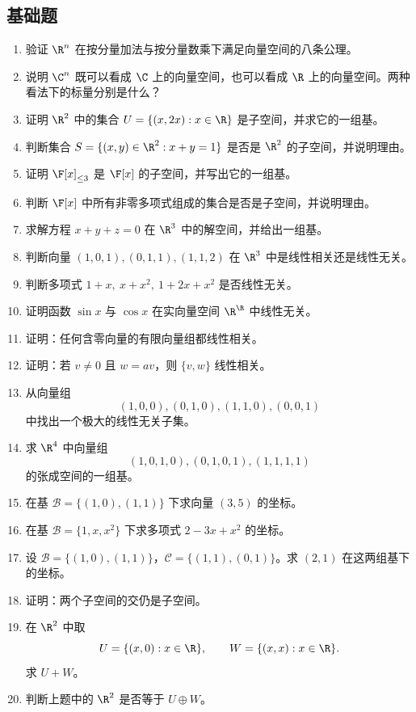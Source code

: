 \subsection*{基础题}
\begin{enumerate}[label=\arabic*., leftmargin=2.5em]
  \item \basic 验证 $\R^n$ 在按分量加法与按分量数乘下满足向量空间的八条公理。
  \item \basic 说明 $\C^n$ 既可以看成 $\C$ 上的向量空间，也可以看成 $\R$ 上的向量空间。两种看法下的标量分别是什么？
  \item \basic 证明 $\R^2$ 中的集合 $U=\{(x,2x):x\in\R\}$ 是子空间，并求它的一组基。
  \item \basic 判断集合 $S=\{(x,y)\in\R^2:x+y=1\}$ 是否是 $\R^2$ 的子空间，并说明理由。
  \item \basic 证明 $\F[x]_{\le 3}$ 是 $\F[x]$ 的子空间，并写出它的一组基。
  \item \basic 判断 $\F[x]$ 中所有非零多项式组成的集合是否是子空间，并说明理由。
  \item \basic 求解方程 $x+y+z=0$ 在 $\R^3$ 中的解空间，并给出一组基。
  \item \basic 判断向量 $(1,0,1),(0,1,1),(1,1,2)$ 在 $\R^3$ 中是线性相关还是线性无关。
  \item \basic 判断多项式 $1+x,\ x+x^2,\ 1+2x+x^2$ 是否线性无关。
  \item \basic 证明函数 $\sin x$ 与 $\cos x$ 在实向量空间 $\R^{\R}$ 中线性无关。
  \item \basic 证明：任何含零向量的有限向量组都线性相关。
  \item \basic 证明：若 $v\ne 0$ 且 $w=av$，则 $\{v,w\}$ 线性相关。
  \item \basic 从向量组
  \[
  (1,0,0),(0,1,0),(1,1,0),(0,0,1)
  \]
  中找出一个极大的线性无关子集。
  \item \basic 求 $\R^4$ 中向量组
  \[
  (1,0,1,0),(0,1,0,1),(1,1,1,1)
  \]
  的张成空间的一组基。
  \item \basic 在基 $\mathcal B=\{(1,0),(1,1)\}$ 下求向量 $(3,5)$ 的坐标。
  \item \basic 在基 $\mathcal B=\{1,x,x^2\}$ 下求多项式 $2-3x+x^2$ 的坐标。
  \item \basic 设 $\mathcal B=\{(1,0),(1,1)\}$，$\mathcal C=\{(1,1),(0,1)\}$。求 $(2,1)$ 在这两组基下的坐标。
  \item \basic 证明：两个子空间的交仍是子空间。
  \item \basic 在 $\R^2$ 中取
  \[
  U=\{(x,0):x\in\R\},\qquad W=\{(x,x):x\in\R\}.
  \]
  求 $U+W$。
  \item \basic 判断上题中的 $\R^2$ 是否等于 $U\oplus W$。

\end{enumerate}
